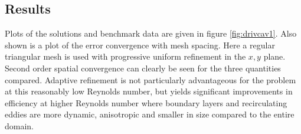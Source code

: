 %
%

\subsection{Results}
Plots of the solutions and benchmark data are given in figure \ref{fig:drivcav1}. Also shown is a plot
of the error convergence with mesh spacing. Here a regular triangular mesh is used with progressive uniform
refinement in the $x,y$ plane. Second order spatial convergence can clearly be seen for the three quantities compared.
Adaptive refinement is not particularly advantageous for the problem at this reasonably low Reynolds number, but
yields significant improvements in efficiency at higher Reynolds number where boundary layers and
recirculating eddies are more dynamic, anisotropic and smaller in size compared to the entire domain.



